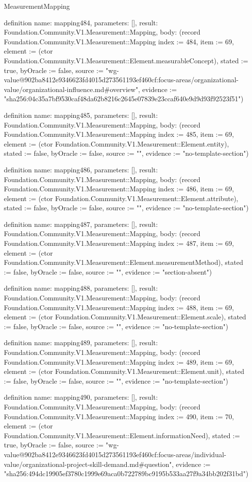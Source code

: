 \begin{lexlean}{MeasurementMapping}
\begin{semanticmodule}
definition{
  name: mapping484,
  parameters: [],
  result: Foundation.Community.V1.Measurement::Mapping,
  body: (record Foundation.Community.V1.Measurement::Mapping {index := 484, item := 69, element := (ctor Foundation.Community.V1.Measurement::Element.measurableConcept), stated := true, byOracle := false, source := "wg-value@902ba8412e9346623fd4015d273561193ef460cf:focus-areas/organizational-value/organizational-influence.md#overview", evidence := "sha256:04c35a7bf9530caf48da62b8216c2645e07839e23ccaf640e9d9d93f92523f51"})
}

definition{
  name: mapping485,
  parameters: [],
  result: Foundation.Community.V1.Measurement::Mapping,
  body: (record Foundation.Community.V1.Measurement::Mapping {index := 485, item := 69, element := (ctor Foundation.Community.V1.Measurement::Element.entity), stated := false, byOracle := false, source := "", evidence := "no-template-section"})
}

definition{
  name: mapping486,
  parameters: [],
  result: Foundation.Community.V1.Measurement::Mapping,
  body: (record Foundation.Community.V1.Measurement::Mapping {index := 486, item := 69, element := (ctor Foundation.Community.V1.Measurement::Element.attribute), stated := false, byOracle := false, source := "", evidence := "no-template-section"})
}

definition{
  name: mapping487,
  parameters: [],
  result: Foundation.Community.V1.Measurement::Mapping,
  body: (record Foundation.Community.V1.Measurement::Mapping {index := 487, item := 69, element := (ctor Foundation.Community.V1.Measurement::Element.measurementMethod), stated := false, byOracle := false, source := "", evidence := "section-absent"})
}

definition{
  name: mapping488,
  parameters: [],
  result: Foundation.Community.V1.Measurement::Mapping,
  body: (record Foundation.Community.V1.Measurement::Mapping {index := 488, item := 69, element := (ctor Foundation.Community.V1.Measurement::Element.scale), stated := false, byOracle := false, source := "", evidence := "no-template-section"})
}

definition{
  name: mapping489,
  parameters: [],
  result: Foundation.Community.V1.Measurement::Mapping,
  body: (record Foundation.Community.V1.Measurement::Mapping {index := 489, item := 69, element := (ctor Foundation.Community.V1.Measurement::Element.unit), stated := false, byOracle := false, source := "", evidence := "no-template-section"})
}

definition{
  name: mapping490,
  parameters: [],
  result: Foundation.Community.V1.Measurement::Mapping,
  body: (record Foundation.Community.V1.Measurement::Mapping {index := 490, item := 70, element := (ctor Foundation.Community.V1.Measurement::Element.informationNeed), stated := true, byOracle := false, source := "wg-value@902ba8412e9346623fd4015d273561193ef460cf:focus-areas/individual-value/organizational-project-skill-demand.md#question", evidence := "sha256:494dc19905ef3780c1999e69aca0b722789bc9195b533aa27f9a34bb202f31bd"})
}


\end{semanticmodule}
\end{lexlean}
